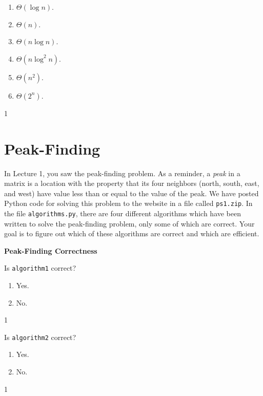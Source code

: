 \documentclass[12pt,twoside]{article}
\begin{document}
\begin{problems}
\begin{problemparts}
\begin{enumerate}
\item $\Theta(\log n)$.
\item $\Theta(n)$.
\item $\Theta(n \log n)$.
\item $\Theta(n \log^2 n)$.
\item $\Theta(n^2)$.
\item $\Theta(2^n)$.
\end{enumerate}

\ifsolution \solution{}
1
\fi

\end{problemparts}

\section*{Peak-Finding}

In Lecture 1,
you saw the peak-finding problem.
As a reminder,
a \emph{peak} in a matrix
is a location with the property that its four neighbors
(north, south, east, and west)
have value less than or equal to the value of the peak.
We have posted Python code for solving this problem
to the website in a file called \texttt{ps1.zip}.
In the file \texttt{algorithms.py},
there are four different algorithms
which have been written
to solve the peak-finding problem,
only some of which are correct.
Your goal is to figure out
which of these algorithms are correct
and which are efficient.

\problem {} \textbf{Peak-Finding Correctness}

\begin{problemparts}

\problempart {} Is \texttt{algorithm1} correct?
\begin{enumerate}
\item Yes.
\item No.
\end{enumerate}

\ifsolution \solution{}
1
\fi

\problempart {} Is \texttt{algorithm2} correct?
\begin{enumerate}
\item Yes.
\item No.
\end{enumerate}

\ifsolution \solution{}
1
\fi


\end{problemparts}
\end{problems}
\end{document}
